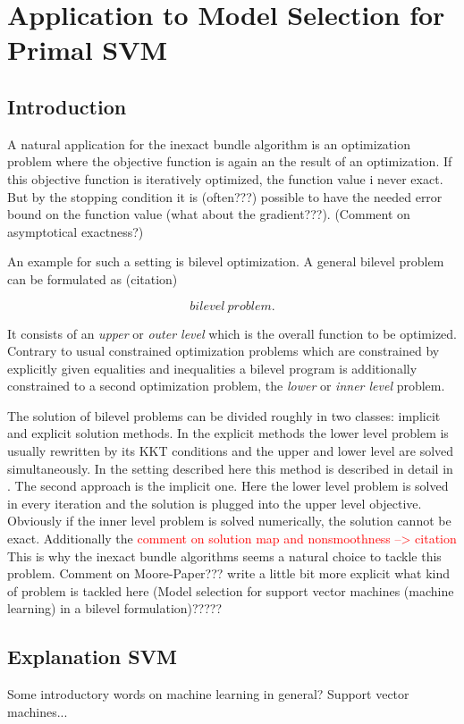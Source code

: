 \section{Application to Model Selection for Primal SVM}

\subsection{Introduction}

A natural application for the inexact bundle algorithm is an optimization problem where the objective function is again an the result of an optimization. If this objective function is iteratively optimized, the function value i never exact. But by the stopping condition it is (often???) possible to have the needed error bound on the function value (what about the gradient???). (Comment on asymptotical exactness?)

An example for such a setting is bilevel optimization. A general bilevel problem can be formulated as (citation)

\[ bilevel ~ problem. \]

It consists of an \emph{upper} or \emph{outer level} which is the overall function to be optimized. Contrary to usual constrained optimization problems which are constrained by explicitly given equalities and inequalities a  bilevel program is additionally constrained to a second optimization problem, the \emph{lower} or \emph{inner level} problem.

The solution of bilevel problems can be divided roughly in two classes: implicit and explicit solution methods.
In the explicit methods the lower level problem is usually rewritten by its KKT conditions and the upper and lower level are solved simultaneously. In the setting described here this method is described in detail in \cite{Kunapuli2008}.
The second approach is the implicit one. Here the lower level problem is solved in every iteration and the solution is plugged into the upper level objective.
Obviously if the inner level problem is solved numerically, the solution cannot be exact. Additionally the \textcolor{red}{comment on solution map and nonsmoothness --> citation}
This is why the inexact bundle algorithms seems a natural choice to tackle this problem.
Comment on Moore-Paper???
write a little bit more explicit what kind of problem is tackled here (Model selection for support vector machines (machine learning) in a bilevel formulation)?????

\subsection{Explanation SVM}
Some introductory words on machine learning in general?
Support vector machines...



